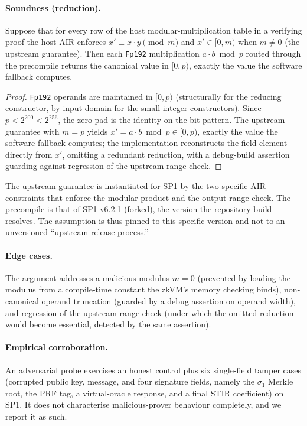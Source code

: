 \paragraph{Soundness (reduction).}
\begin{lemma}\label{lem:fp192-mul}
    Suppose that for every row of the host modular-multiplication table in a verifying proof the host AIR enforces $x' \equiv x\cdot y \pmod{m}$ and $x' \in [0,m)$ when $m\neq 0$ (the upstream guarantee). Then each \texttt{Fp192} multiplication $a\cdot b \bmod p$ routed through the precompile returns the canonical value in $[0,p)$, exactly the value the software fallback computes.
\end{lemma}
\begin{proof}
    \texttt{Fp192} operands are maintained in $[0,p)$ (structurally for the reducing constructor, by input domain for the small-integer constructors). Since $p < 2^{200} < 2^{256}$, the zero-pad is the identity on the bit pattern. The upstream guarantee with $m=p$ yields $x' = a\cdot b \bmod p \in [0,p)$, exactly the value the software fallback computes; the implementation reconstructs the field element directly from $x'$, omitting a redundant reduction, with a debug-build assertion guarding against regression of the upstream range check.
\end{proof}
The upstream guarantee is instantiated for SP1 by the two specific AIR constraints that enforce the modular product and the output range check. The precompile is that of SP1 v6.2.1 (forked), the version the repository build resolves. The assumption is thus pinned to this specific version and not to an unversioned ``upstream release process.''

\paragraph{Edge cases.}
The argument addresses a malicious modulus $m=0$ (prevented by loading the modulus from a compile-time constant the zkVM's memory checking binds), non-canonical operand truncation (guarded by a debug assertion on operand width), and regression of the upstream range check (under which the omitted reduction would become essential, detected by the same assertion).

\paragraph{Empirical corroboration.}
An adversarial probe exercises an honest control plus six single-field tamper cases (corrupted public key, message, and four signature fields, namely the $\sigma_1$ Merkle root, the PRF tag, a virtual-oracle response, and a final STIR coefficient) on SP1. It does not characterise malicious-prover behaviour completely, and we report it as such.

